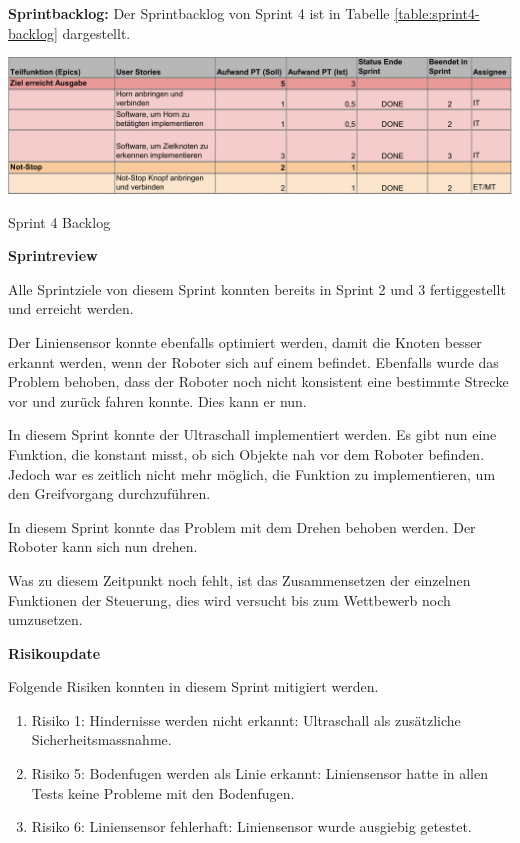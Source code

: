 \textbf{Sprintbacklog:} Der Sprintbacklog von Sprint 4 ist in Tabelle 
\ref{table:sprint4-backlog} 
dargestellt.


\begin{table}[H]
\centering
\includegraphics[width=\textwidth]{assets/projektmanagement/sprint4-crop.pdf}
\caption{Sprint 4 Backlog}
\label{table:sprint4-backlog}
\end{table}


\textbf{Sprintreview}

Alle Sprintziele von diesem Sprint konnten bereits in Sprint 2 und 3 fertiggestellt und erreicht werden.

Der Liniensensor konnte ebenfalls optimiert werden, damit die Knoten besser erkannt werden, wenn der Roboter sich auf einem befindet. Ebenfalls wurde das Problem behoben, dass der Roboter noch nicht konsistent eine bestimmte Strecke vor und zurück fahren konnte. Dies kann er nun.

In diesem Sprint konnte der Ultraschall implementiert werden. Es gibt nun eine Funktion, die konstant misst, ob sich Objekte nah vor dem Roboter befinden. Jedoch war es zeitlich nicht mehr möglich, die Funktion zu implementieren, um den Greifvorgang durchzuführen.

In diesem Sprint konnte  das Problem mit dem Drehen behoben werden. Der Roboter kann sich nun drehen.

Was zu diesem Zeitpunkt noch fehlt, ist das Zusammensetzen der einzelnen Funktionen der Steuerung, dies wird versucht bis zum Wettbewerb noch umzusetzen.

\textbf{Risikoupdate}

Folgende Risiken konnten in diesem Sprint mitigiert werden.

\begin{enumerate}
    \item Risiko 1: Hindernisse werden nicht erkannt: Ultraschall als zusätzliche Sicherheitsmassnahme.
    \item Risiko 5: Bodenfugen werden als Linie erkannt: Liniensensor hatte in allen Tests keine Probleme mit den Bodenfugen.
    \item Risiko 6: Liniensensor fehlerhaft: Liniensensor wurde ausgiebig getestet.
\end{enumerate}

